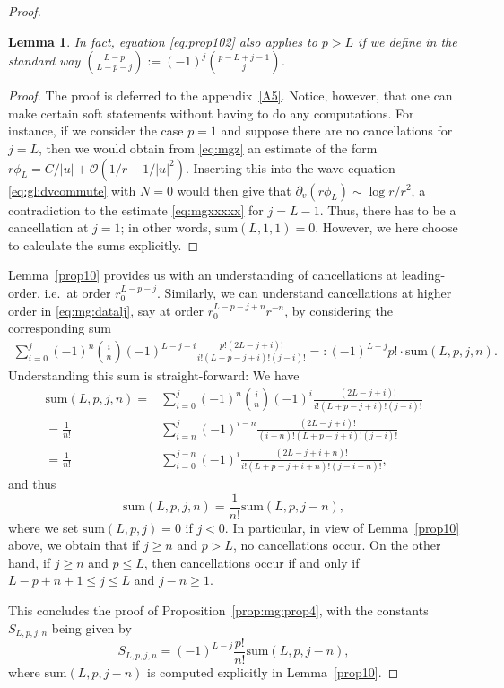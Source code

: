 \documentclass[11pt,english]{article}
\numberwithin{equation}{section}
\newtheorem{lemma}{Lemma}[section]
\theoremstyle{remark}
\theoremstyle{plain}
\theoremstyle{remark}
\newcommand{\pv}{\partial_v}
\renewcommand{\(}{\left(}
\renewcommand{\)}{\right)}
\begin{document}
\begin{proof}
\begin{lemma}
In fact, equation \eqref{eq:prop102} also applies to $p>L$ if we define in the standard way  $\binom{L-p}{L-p-j}:=(-1)^{j} \binom{p-L+j-1}{j}$.
\end{lemma}
\begin{proof}
The proof is deferred to the appendix~\ref{A5}. Notice, however, that one can make certain soft statements without having to do any computations. For instance, if we consider the case $p=1$ and suppose there are no cancellations for $j=L$, then we would obtain from \eqref{eq:mgz} an estimate of the form $r\phi_L=C/|u|+\mathcal O(1/r+1/|u|^2)$. Inserting this into the wave equation \eqref{eq:gl:dvcommute} with $N=0$ would then give that $\pv(r\phi_L)\sim \log r/r^2$, a contradiction to the estimate \eqref{eq:mgxxxxx} for $j=L-1$. Thus, there has to be a cancellation at $j=1$; in other words, $\mathrm{sum}(L,1,1)=0$. However, we here choose to calculate the sums explicitly.
\end{proof}
Lemma~\ref{prop10} provides us with an understanding of cancellations at leading-order, i.e.\ at order $r_0^{L-p-j}$. Similarly, we can understand cancellations at higher order in \eqref{eq:mg:datalj}, say at order $r_0^{L-p-j+n}r^{-n}$, by considering the corresponding sum
\begin{align}
\sum_{i=0}^j(-1)^n \binom{i}{n} (-1)^{L-j+i} \frac{p!(2L-j+i)!}{i!(L+p-j+i)!(j-i)!}=: (-1)^{L-j}p!\cdot\mathrm{sum}(L,p,j,n).
\end{align}
Understanding this sum is straight-forward: We have
\begin{align*}
\mathrm{sum}(L,p,j,n)=&\sum_{i=0}^j(-1)^n\binom{i}{n} (-1)^{i} \frac{(2L-j+i)!}{i!(L+p-j+i)!(j-i)!}\\
=\frac{1}{n!} &\sum_{i=n}^j (-1)^{i-n} \frac{(2L-j+i)!}{(i-n)!(L+p-j+i)!(j-i)!}\\
=\frac{1}{n!} &\sum_{i=0}^{j-n} (-1)^{i} \frac{(2L-j+i+n)!}{i!(L+p-j+i+n)!(j-i-n)!},
\end{align*}
and thus
\begin{equation}
\mathrm{sum}(L,p,j,n)=\frac{1}{n!}\mathrm{sum}(L,p,j-n),
\end{equation}
where we set $\mathrm{sum}(L,p,j)=0$ if $j<0$.
In particular, in view of Lemma~\ref{prop10} above, we obtain that if $j\geq n$ and $p> L$, no cancellations occur. On the other hand, if $j\geq n$ and $p\leq L$, then cancellations occur if and only if $L-p+n+1\leq j\leq L$ and $j-n\geq 1$.

This concludes the proof of Proposition~\ref{prop:mg:prop4}, with the constants $ S_{L,p,j,n}$ being given by
\begin{equation}\label{eq:mg:SLPj-n}
 S_{L,p,j,n}=(-1)^{L-j}\frac{p!}{n!}\mathrm{sum}(L,p,j-n),
\end{equation}
where $\mathrm{sum}(L,p,j-n)$ is computed explicitly in Lemma~\ref{prop10}.
\end{proof}
\end{document}
